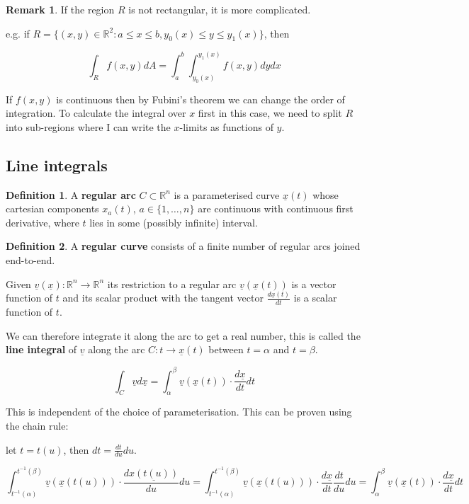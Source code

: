 \documentclass[12pt,a4paper]{article}
\theoremstyle{definition}
\newtheorem{definition}{Definition}[subsection]
\newtheorem*{remark}{Remark}
\begin{document}
\begin{remark}
	If the region $R$ is not rectangular, it is more complicated.
	
	e.g. if $R = \{(x, y) \in \mathbb{R}^2: a \le x \le b, y_0(x) \le y \le y_1(x)\}$, then
	
	\[\int_R f(x, y) dA = \int_a^b \int_{y_0(x)}^{y_1(x)} f(x, y) dy dx\]

	If $f(x, y)$ is continuous then by Fubini's theorem we can change the order of integration. To calculate the integral over $x$ first in this case, we need to split $R$ into sub-regions where I can write the $x$-limits as functions of $y$.
\end{remark}

\subsection{Line integrals}

\begin{definition}
	A \textbf{regular arc} $C \subset \mathbb{R}^n$ is a parameterised curve $\underline{x}(t)$ whose cartesian components $x_a(t)$, $a \in \{1, \dots, n\}$ are continuous with continuous first derivative, where $t$ lies in some (possibly infinite) interval.	
\end{definition}

\begin{definition}
	A \textbf{regular curve} consists of a finite number of regular arcs joined end-to-end.
\end{definition}

Given $\underline{v}(\underline{x}): \mathbb{R}^n \rightarrow \mathbb{R}^n$ its restriction to a regular arc $\underline{v}(\underline{x}(t))$ is a vector function of $t$ and its scalar product with the tangent vector $\frac{d\underline{x}(t)}{dt}$ is a scalar function of $t$.

We can therefore integrate it along the arc to get a real number, this is called the \textbf{line integral} of $\underline{v}$ along the arc $C: t \rightarrow \underline{x}(t)$ between $t = \alpha$ and $t = \beta$.

\[\int_C \underline{v} d\underline{x} = \int_{\alpha}^{\beta} \underline{v}(\underline{x}(t)) \cdot \frac{d\underline{x}}{dt} dt\]

This is independent of the choice of parameterisation. This can be proven using the chain rule:

let $t = t(u)$, then $dt = \frac{dt}{du} du$.

\[\int_{t^{-1}(\alpha)}^{t^{-1}(\beta)} \underline{v}(\underline{x}(t(u))) \cdot \frac{d\underline{x(t(u))}}{du} du = \int_{t^{-1}(\alpha)}^{t^{-1}(\beta)} \underline{v}(\underline{x}(t(u))) \cdot \frac{d\underline{x}}{dt} \frac{dt}{du} du = \int_{\alpha}^{\beta} \underline{v}(\underline{x}(t)) \cdot \frac{d\underline{x}}{dt} dt\]
\end{document}
